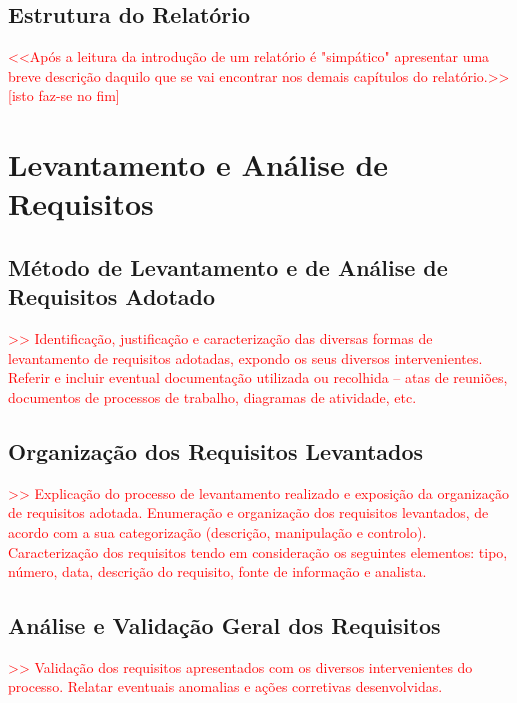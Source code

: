 \documentclass[a4paper,12pt]{scrreprt}
\begin{document}
    \section{Estrutura do Relatório}
        \textcolor{red}{
            <<Após a leitura da introdução de um relatório é "simpático" apresentar uma breve descrição daquilo que se vai encontrar nos demais capítulos do relatório.>>
        } \\
        \textcolor{red}{[isto faz-se no fim]}


\chapter{Levantamento e Análise de Requisitos}
    \section{Método de Levantamento e de Análise de Requisitos Adotado}
        \textcolor{red}{
            >> Identificação, justificação e caracterização das diversas formas de levantamento de requisitos adotadas, expondo os seus diversos intervenientes. Referir e incluir eventual documentação utilizada ou recolhida – atas de reuniões, documentos de processos de trabalho, diagramas de atividade, etc.
        }
    \section{Organização dos Requisitos Levantados}
        \textcolor{red}{
            >> Explicação do processo de levantamento realizado e exposição da organização de requisitos adotada. Enumeração e organização dos requisitos levantados, de acordo com a sua categorização (descrição, manipulação e controlo). Caracterização dos requisitos tendo em consideração os seguintes elementos: tipo, número, data, descrição do requisito, fonte de informação e analista.
        }
    \section{Análise e Validação Geral dos Requisitos}
        \textcolor{red}{
            >> Validação dos requisitos apresentados com os diversos intervenientes do processo. Relatar eventuais anomalias e ações corretivas desenvolvidas.
        }
\end{document}
